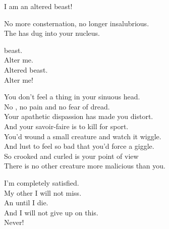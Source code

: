 I am an altered beast! \\





No more consternation, no longer insalubrious. \\
The   has dug into your nucleus. \\


 beast. \\
Alter me. \\
Altered beast. \\
Alter me! \\





You don't feel a thing in your sinuous head. \\
No , no pain and no fear of dread. \\

Your apathetic dispassion has made you distort. \\
And your savoir-faire is to kill for sport. \\

You'd wound a small creature and watch it wiggle. \\
And lust to feel so bad that you'd force a giggle. \\

So crooked and curled is your point of view \\
There is no other creature more malicious than you. \\


I'm completely satisfied. \\
My other  I will not miss. \\
An   until I die. \\
And I will not give up on this. \\
Never! \\

